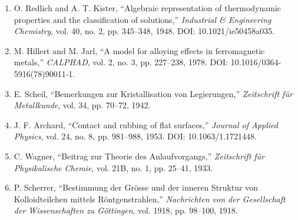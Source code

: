 \documentclass[11pt,a4paper]{article}
\begin{document}
\begin{enumerate}
  \item O. Redlich and A. T. Kister, ``Algebraic representation of thermodynamic properties and the classification of solutions,'' \textit{Industrial \& Engineering Chemistry}, vol. 40, no. 2, pp. 345--348, 1948. DOI: 10.1021/ie50458a035.
  \item M. Hillert and M. Jarl, ``A model for alloying effects in ferromagnetic metals,'' \textit{CALPHAD}, vol. 2, no. 3, pp. 227--238, 1978. DOI: 10.1016/0364-5916(78)90011-1.
  \item E. Scheil, ``Bemerkungen zur Kristallisation von Legierungen,'' \textit{Zeitschrift f{\"u}r Metallkunde}, vol. 34, pp. 70--72, 1942.
  \item J. F. Archard, ``Contact and rubbing of flat surfaces,'' \textit{Journal of Applied Physics}, vol. 24, no. 8, pp. 981--988, 1953. DOI: 10.1063/1.1721448.
  \item C. Wagner, ``Beitrag zur Theorie des Anlaufvorgangs,'' \textit{Zeitschrift f{\"u}r Physikalische Chemie}, vol. 21B, no. 1, pp. 25--41, 1933.
  \item P. Scherrer, ``Bestimmung der Gr{\"o}sse und der inneren Struktur von Kolloidteilchen mittels R{\"o}ntgenstrahlen,'' \textit{Nachrichten von der Gesellschaft der Wissenschaften zu G{\"o}ttingen}, vol. 1918, pp. 98--100, 1918.
\end{enumerate}
\end{document}
